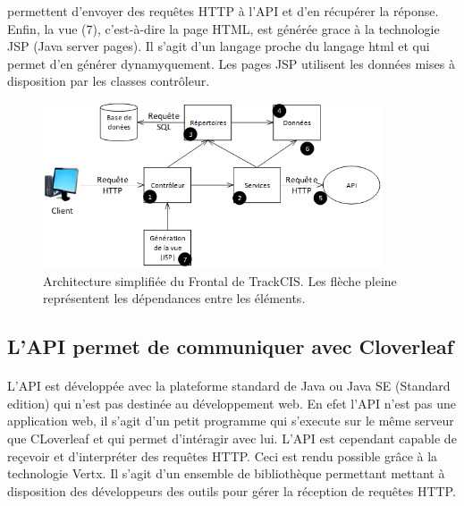 			permettent d'envoyer des requêtes HTTP à l'API et d'en récupérer la réponse.
			Enfin, la vue (7), c'est-à-dire la page HTML, est générée grace à la
			technologie JSP (Java server pages). Il s'agit d'un langage proche du
			langage html et qui permet d'en générer dynamyquement. Les pages JSP
			utilisent les données mises à disposition par les classes contrôleur.
			\begin{figure}[H]
				\centering
				\includegraphics[width=10cm]{../img/part3/archi_actuelle_front.png}
				\caption{\label{archi_actuelle_front} Architecture simplifiée du Frontal
				de TrackCIS. Les flèche pleine représentent les dépendances entre les
				éléments.}
			\end{figure}
			
		\subsection{L'API permet de communiquer avec Cloverleaf}
			\paragraph{}%
			L'API est développée avec la plateforme standard de Java ou Java SE (Standard
			edition) qui n'est pas destinée au développement web. En efet l'API n'est pas
			une application web, il s'agit d'un petit programme qui s'execute sur le même
			serveur que CLoverleaf et qui permet d'intéragir avec lui. L'API est
			cependant capable de reçevoir et d'interpréter des requêtes HTTP. Ceci est
			rendu possible grâce à la technologie Vertx. Il s'agit d'un ensemble de
			bibliothèque permettant mettant à disposition des développeurs des outils
			pour gérer la réception de requêtes HTTP.
			
